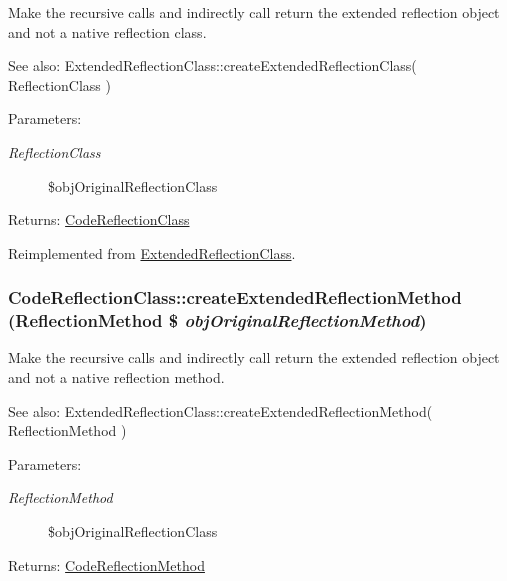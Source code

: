 Make the recursive calls and indirectly call return the extended reflection object and not a native reflection class.

\begin{Desc}
\item[See also:]ExtendedReflectionClass::createExtendedReflectionClass( ReflectionClass ) \end{Desc}
\begin{Desc}
\item[Parameters:]
\begin{description}
\item[{\em ReflectionClass}]\$objOriginalReflectionClass \end{description}
\end{Desc}
\begin{Desc}
\item[Returns:]\hyperlink{class_code_reflection_class}{CodeReflectionClass} \end{Desc}


Reimplemented from \hyperlink{class_extended_reflection_class_851f69035820c89d0ba918a277d2a29f}{ExtendedReflectionClass}.\hypertarget{class_code_reflection_class_c8e58a7369660bf8f63ce39f3b9b5271}{
\subsubsection[{createExtendedReflectionMethod}]{\setlength{\rightskip}{0pt plus 5cm}CodeReflectionClass::createExtendedReflectionMethod (ReflectionMethod \$ {\em objOriginalReflectionMethod})}}
\label{class_code_reflection_class_c8e58a7369660bf8f63ce39f3b9b5271}


Make the recursive calls and indirectly call return the extended reflection object and not a native reflection method.

\begin{Desc}
\item[See also:]ExtendedReflectionClass::createExtendedReflectionMethod( ReflectionMethod ) \end{Desc}
\begin{Desc}
\item[Parameters:]
\begin{description}
\item[{\em ReflectionMethod}]\$objOriginalReflectionClass \end{description}
\end{Desc}
\begin{Desc}
\item[Returns:]\hyperlink{class_code_reflection_method}{CodeReflectionMethod} \end{Desc}


